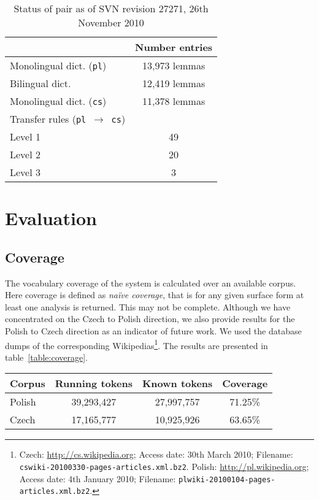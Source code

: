 \documentclass[11pt]{article}
\begin{document}
\begin{table}
\centering
\begin{tabular}{|l|c|}
\hline
                                           & Number entries\\
\hline
Monolingual dict. ({\tt pl})               & 13,973 lemmas \\
Bilingual dict.                            & 12,419 lemmas \\
Monolingual dict. ({\tt cs})               & 11,378 lemmas \\
\hline
Transfer rules ({\tt pl $\rightarrow$ cs}) &  \\
\hline
Level 1                                    & 49 \\
Level 2                                    & 20 \\
Level 3                                    & 3 \\
\hline
\end{tabular}
    \caption{Status of pair as of SVN revision 27271, 26th November 2010}
    \label{table:status}
\end{table}

\section{Evaluation}
\subsection{Coverage}

The vocabulary coverage of the system is calculated over an available corpus. Here coverage
is defined as \emph{na\"ive coverage}, that is for any given surface form at least one analysis
is returned. This may not be complete. Although we have concentrated on the Czech to Polish
direction, we also provide results for the Polish to Czech direction as an indicator of
future work.
We used the database dumps of the corresponding Wikipedias\footnote{Czech: \url{http://cs.wikipedia.org}; Access date: 30th March 2010; Filename: 
{\small\tt cswiki-20100330-pages-articles.xml.bz2}. Polish: \url{http://pl.wikipedia.org}; Access date: 4th January 2010; Filename: 
{\small\tt plwiki-20100104-pages-articles.xml.bz2}.}. The results are presented in table~\ref{table:coverage}.

\begin{table*}
\centering
\begin{tabular}{|l|c|c|c|}
\hline
Corpus & Running tokens & Known tokens & Coverage \\
\hline
Polish  & 39,293,427 & 27,997,757 & 71.25\%\\
Czech   & 17,165,777 & 10,925,926 & 63.65\%\\
\hline
\end{tabular}
    \caption{Naïve coverage for both translation directions}
    \label{table:coverage}
\end{table*}
\end{document}
